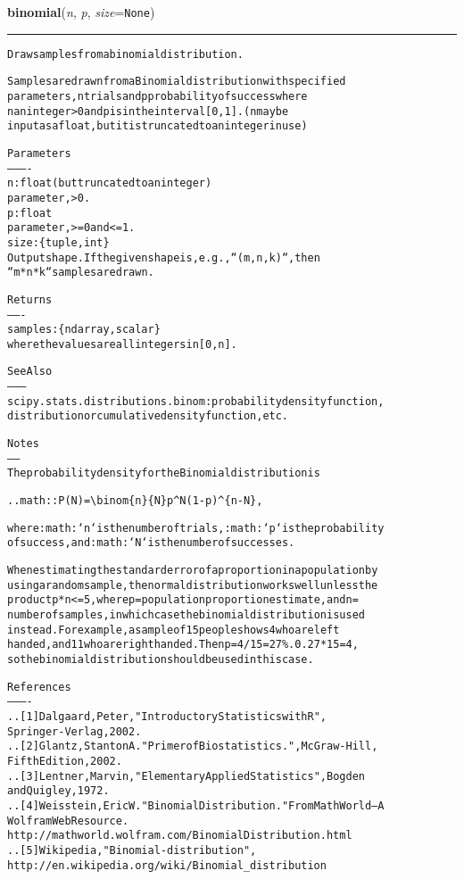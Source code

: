     \vspace{0.5ex}

\hspace{.8\funcindent}\begin{boxedminipage}{\funcwidth}

    \raggedright \textbf{binomial}(\textit{n}, \textit{p}, \textit{size}={\tt None})

    \vspace{-1.5ex}

    \rule{\textwidth}{0.5\fboxrule}
\setlength{\parskip}{2ex}
\begin{alltt}
Draw samples from a binomial distribution.

Samples are drawn from a Binomial distribution with specified
parameters, n trials and p probability of success where
n an integer {\textgreater} 0 and p is in the interval [0,1]. (n may be
input as a float, but it is truncated to an integer in use)

Parameters
----------
n : float (but truncated to an integer)
        parameter, {\textgreater} 0.
p : float
        parameter, {\textgreater}= 0 and {\textless}=1.
size : \{tuple, int\}
    Output shape.  If the given shape is, e.g., ``(m, n, k)``, then
    ``m * n * k`` samples are drawn.

Returns
-------
samples : \{ndarray, scalar\}
          where the values are all integers in  [0, n].

See Also
--------
scipy.stats.distributions.binom : probability density function,
    distribution or cumulative density function, etc.

Notes
-----
The probability density for the Binomial distribution is

.. math:: P(N) = {\textbackslash}binom\{n\}\{N\}p{\textasciicircum}N(1-p){\textasciicircum}\{n-N\},

where :math:`n` is the number of trials, :math:`p` is the probability
of success, and :math:`N` is the number of successes.

When estimating the standard error of a proportion in a population by
using a random sample, the normal distribution works well unless the
product p*n {\textless}=5, where p = population proportion estimate, and n =
number of samples, in which case the binomial distribution is used
instead. For example, a sample of 15 people shows 4 who are left
handed, and 11 who are right handed. Then p = 4/15 = 27\%. 0.27*15 = 4,
so the binomial distribution should be used in this case.

References
----------
.. [1] Dalgaard, Peter, "Introductory Statistics with R",
       Springer-Verlag, 2002.
.. [2] Glantz, Stanton A. "Primer of Biostatistics.", McGraw-Hill,
       Fifth Edition, 2002.
.. [3] Lentner, Marvin, "Elementary Applied Statistics", Bogden
       and Quigley, 1972.
.. [4] Weisstein, Eric W. "Binomial Distribution." From MathWorld--A
       Wolfram Web Resource.
       http://mathworld.wolfram.com/BinomialDistribution.html
.. [5] Wikipedia, "Binomial-distribution",
       http://en.wikipedia.org/wiki/Binomial\_distribution


\end{alltt}
\end{boxedminipage}
